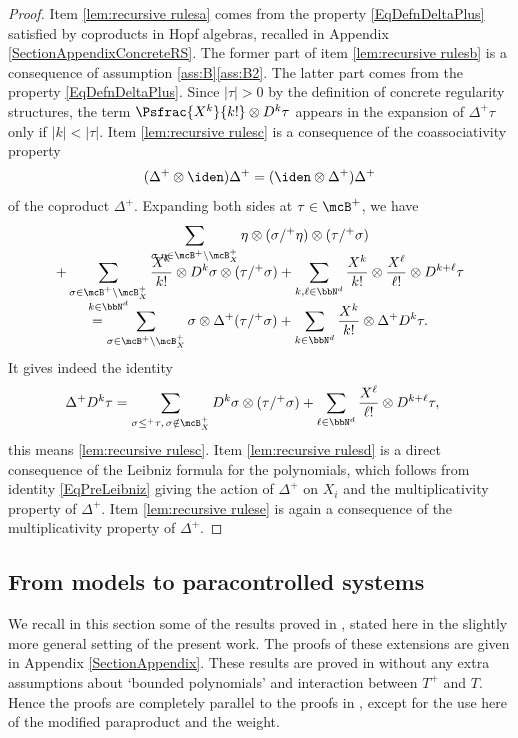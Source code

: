 \begin{proof}
Item \eqref{lem:recursive rulesa} comes from the property \eqref{EqDefnDeltaPlus} satisfied by coproducts in Hopf algebras, recalled in Appendix \ref{SectionAppendixConcreteRS}. The former part of item \eqref{lem:recursive rulesb} is a consequence of assumption \ref{ass:B}\eqref{ass:B2}.
The latter part comes from the property \eqref{EqDefnDeltaPlus}. Since $|\tau|>0$ by the definition of concrete regularity structures, the term $\Psfrac{X^k}{k!}\otimes D^k\tau$ appears in the expansion of $\Delta^+\tau$ only if $|k|<|\tau|$.
Item \eqref{lem:recursive rulesc} is a consequence of the coassociativity property
\[
(\Delta^+\otimes\iden)\Delta^+ = (\iden\otimes\Delta^+)\Delta^+
\]
of the coproduct $\Delta^+$. Expanding both sides at $\tau\in\mcB^+$, we have
\begin{multline*}
\sum_{\sigma,\eta\in\mcB^+\setminus\mcB_X^+}\eta\otimes(\sigma/^+\eta)\otimes(\tau/^+\sigma)\\[-10pt]
+\sum_{\substack{\sigma\in\mcB^+\setminus\mcB_X^+\\k\in\bbN^d}}\frac{X^k}{k!}\otimes D^k\sigma\otimes(\tau/^+\sigma)
+\sum_{k,\ell\in\bbN^d}\frac{X^k}{k!}\otimes\frac{X^\ell}{\ell!}\otimes D^{k+\ell}\tau\\[-10pt]
=\sum_{\sigma\in\mcB^+\setminus\mcB_X^+}\sigma\otimes\Delta^+(\tau/^+\sigma)
+\sum_{k\in\bbN^d}\frac{X^k}{k!}\otimes \Delta^+D^k\tau.
\end{multline*}
It gives indeed the identity
\begin{align}
\label{defi:D^ktau}
\Delta^+D^k\tau &= \sum_{\sigma\leq^+\tau,\, \sigma\notin\mcB_X^+}D^k\sigma\otimes(\tau/^+\sigma) + \sum_{\ell\in\bbN^d}\frac{X^{\ell}}{\ell!}\otimes D^{k+\ell}\tau,
\end{align}
this means \eqref{lem:recursive rulesc}. Item \eqref{lem:recursive rulesd} is a direct consequence of the Leibniz formula for the polynomials, which follows from identity \eqref{EqPreLeibniz} giving the action of $\Delta^+$ on $X_i$ and the multiplicativity property of $\Delta^+$. Item \eqref{lem:recursive rulese} is again a consequence of the multiplicativity property of $\Delta^+$.
\end{proof}

\subsection{From models to paracontrolled systems}
\label{SubsectionFromModelsToPCSystems}

We recall in this section some of the results proved in \cite{BH}, stated here in the slightly more general setting of the present work.
The proofs of these extensions are given in Appendix \ref{SectionAppendix}. These results are proved in \cite[\S\S2\,\&\,3]{BH} without any extra assumptions about `bounded polynomials' and interaction between $T^+$ and $T$. Hence the proofs are completely parallel to the proofs in \cite{BH}, except for the use here of the modified paraproduct and the weight.

